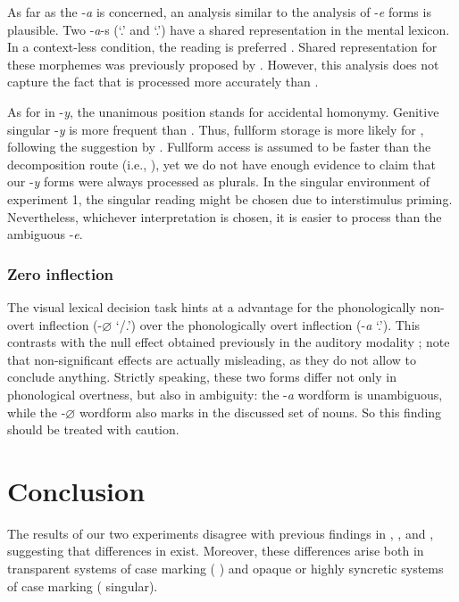 \documentclass[output=paper, modfonts,newtxmath,hidelinks]{langscibook}
\begin{document}
As far as the   -\textit{a} is concerned, an analysis similar to the analysis of -\textit{e} forms is plausible. Two -\textit{a}-s (`\genn.\masc' and `\nomm.\fem')
have a shared representation in the mental lexicon. In a context-less condition, the  reading is preferred . Shared representation for these morphemes was previously proposed by \citet{muller2004decomposing, wunderlich2004there}. However, this analysis does not capture the fact that   is processed more accurately than  .

As for   in -\textit{y}, the unanimous position \citep{muller2004decomposing,wunderlich2004there,wiese2004categories} stands for accidental homonymy. Genitive singular -\textit{y} is more frequent than   \citep{samojlova2014frequencies}. Thus, fullform storage is more likely for  , following the suggestion by \citet{bertram2000role}. Fullform access is assumed to be faster than the decomposition route (i.e., \citealt{bertram2000role}), yet we do not have enough evidence to claim that our -\textit{y} forms were always processed as  plurals. In the singular environment of experiment 1, the singular reading might be chosen due to interstimulus priming. Nevertheless, whichever interpretation is chosen, it is easier to process than the ambiguous -\textit{e}.

\subsubsection{{Zero  inflection}}
The visual lexical decision task hints at a  advantage for the phonologically non-overt inflection (-\textit{$\varnothing$} `{\nomm/\accc.\masc}’) over the phonologically overt inflection (-\textit{a} `{\nomm.\fem}’). This contrasts with the null effect obtained previously in the auditory modality \citep{gor2017processing}; note that non-significant effects are actually misleading, as they do not allow to conclude anything. Strictly speaking, these two forms differ not only in phonological overtness, but also in ambiguity: the -\textit{a} wordform is unambiguous, while the -\textit{$\varnothing$} wordform also marks  in the discussed set of nouns. So this finding should be treated with caution.

\section{Conclusion}
The results of our two experiments disagree with previous findings in , , and , suggesting that differences in   exist. Moreover, these differences arise both in transparent systems of case marking ( ) and opaque or highly syncretic systems of case marking ( singular). 
\end{document}
